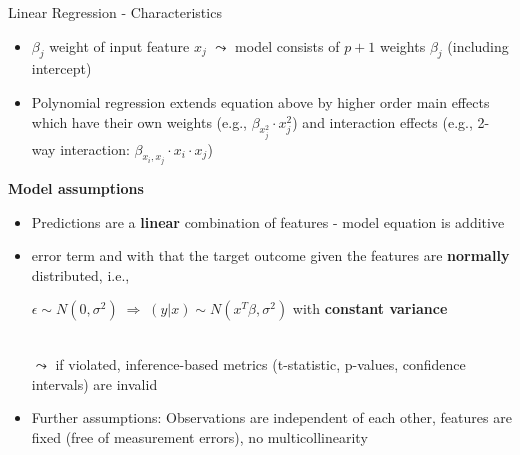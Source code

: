 \documentclass[11pt,compress,t,notes=noshow, aspectratio=169, xcolor=table]{beamer}
\begin{document}
\begin{frame}[c]{Linear Regression - Characteristics}
    \begin{itemize}
        \item $\beta_j$ weight of input feature $x_j$ $\leadsto$ model consists of $p+1$ weights $\beta_j$ (including intercept)
        \item Polynomial regression extends equation above by higher order main effects which have their own weights (e.g., $\beta_{x_j^2} \cdot x_j^2$) and interaction effects (e.g., 2-way interaction: $\beta_{x_i, x_j} \cdot x_i \cdot x_j$)
    \end{itemize}
   \vspace*{0.2cm} 
    \textbf{Model assumptions}
    \begin{itemize}
    \item Predictions are a \textbf{linear} combination of features - model equation is additive%
    \item error term and with that the target outcome given the features are \textbf{normally} distributed, i.e., 
    \centerline{$\epsilon \sim N(0, \sigma^2) \; \Rightarrow \; (y \vert x) \sim N(x^T \beta, \sigma^2)$ with \textbf{constant variance}}\\
    $\leadsto$ if violated, inference-based metrics (t-statistic, p-values, confidence intervals) are invalid
    \item Further assumptions: Observations are independent of each other, features are fixed (free of measurement errors), no multicollinearity

\end{itemize}
\end{frame}
\end{document}
